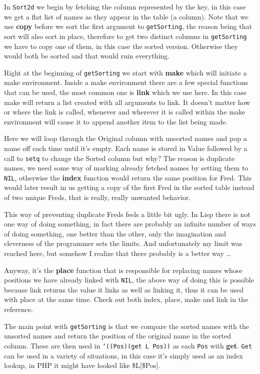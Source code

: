 In \texttt{Sort2d} we begin by fetching the column represented by the
key, in this case we get a flat list of names as they appear in the
table (a column). Note that we use \textbf{copy} before we sort the
first argument to \texttt{getSorting}, the reason being that sort will
also sort in place, therefore to get two distinct columns in
\texttt{getSorting} we have to copy one of them, in this case the
sorted version. Otherwise they would both be sorted and that would
ruin everything.

Right at the beginning of \texttt{getSorting} we start with
\textbf{make} which will initiate a make environment. Inside a make
environment there are a few special functions that can be used, the
most common one is \textbf{link} which we use here. In this case make
will return a list created with all arguments to link. It doesn't
matter how or where the link is called, whenever and wherever it is
called within the make environment will cause it to append another
item to the list being made.

Here we will loop through the Original column with unsorted names and
pop a name off each time until it's empty. Each name is stored in
Value followed by a call to \texttt{setq} to change the Sorted column
but why? The reason is duplicate names, we need some way of marking
already fetched names by setting them to \texttt{NIL}, otherwise the
\textbf{index} function would return the same position for Fred. This
would later result in us getting a copy of the first Fred in the
sorted table instead of two unique Freds, that is really, really
unwanted behavior.

This way of preventing duplicate Freds feels a little bit ugly. In Lisp
there is not one way of doing something, in fact there are probably an
infinite number of ways of doing something, one better than the other,
only the imagination and cleverness of the programmer sets the limits.
And unfortunately my limit was reached here, but somehow I realize that
there probably is a better way \dots{}

Anyway, it's the \textbf{place} function that is responsible for replacing
names whose positions we have already linked with \texttt{NIL}, the above way of
doing this is possible because link returns the value it links as well
as linking it, thus it can be used with place at the same time. Check
out both index, place, make and link in the reference.

The main point with \texttt{getSorting} is that we compare the sorted
names with the unsorted names and return the position of the original
name in the sorted column. These are then used in \texttt{‘((Pos)(get
  L Pos))} as each \texttt{Pos} with \textbf{get}. \texttt{Get} can be
used in a variety of situations, in this case it's simply used as an
index lookup, in PHP it might have looked like \$L[\$Pos].

